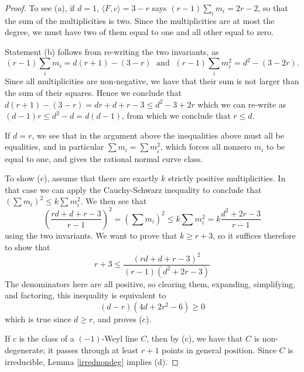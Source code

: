 \documentclass[12pt]{article}
\numberwithin{equation}{section}
\numberwithin{equation}{section}
\numberwithin{subeq}{equation}
\begin{document}
\begin{proof}

To see (a),
if $d=1$, $\langle F,c\rangle=3-r$ says $(r-1)\sum_i m_i = 2r-2$,
so that the sum of the multiplicities is two. 
Since the multiplicities are at most the degree,
we must have two of them equal to one and all other equal to zero.

Statement (b) follows from re-writing the two invariants, as
\[
(r-1)\sum_i m_i = d(r+1)-(3-r) \;\text{ and }\;
(r-1)\sum_i m_i^2 = d^2-(3-2r).
\]
Since all multiplicities are non-negative, we have that their sum 
is not larger than the sum of their squares.  Hence we conclude that
$
d(r+1)-(3-r) =dr+d+r-3 \leq d^2-3+2r
$
which we can re-write as $(d-1)r \leq d^2-d=d(d-1)$,
from which we conclude that $r \leq d$.

If $d=r$, we see that in the argument above
the inequalities above must all be equalities,
and in particular $\sum m_i = \sum m_i^2$, which forces all nonzero $m_i$
to be equal to one, and gives the rational normal curve class.

To show (c), assume that there are exactly $k$ strictly positive multiplicities.
In that case we can apply the Cauchy-Schwarz inequality to conclude that
$(\sum m_i)^2 \leq k\sum m_i^2$.
We then see that
\[
(\frac{rd+d+r-3}{r-1})^2 = (\sum m_i)^2 \leq k\sum m_i^2 = k\frac{d^2+2r-3}{r-1}
\]
using the two invariants.
We want to prove that $k \ge r+3$, so it suffices therefore to show that
\[
r+3 \leq \frac{(rd+d+r-3)^2}{(r-1)(d^2+2r-3)}
\]
The denominators here are all positive, so clearing them,
expanding, simplifying, and factoring, this inequality is equivalent to
\[
(d-r)(4d+2r^2-6) \geq 0
\]
which is true since $d \geq r$, and proves (c).


If $c$ is the class of a $(-1)$-Weyl line $C$,
then by (c), we have that $C$ is non-degenerate;
it passes through at least $r+1$ points in general position.
Since $C$ is irreducible, Lemma \ref{irrednondeg} implies (d).


\end{proof}
\end{document}
